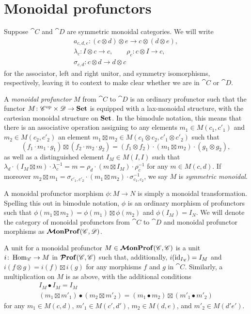 \documentclass[12pt,oneside,article,draft]{memoir}
\begin{document}
\section{Monoidal profunctors}

Suppose $\cat{C}$ and $\cat{D}$ are symmetric monoidal categories.  We will write
\begin{gather*}
   a_{c,d,e}\colon (c\otimes d)\otimes e \to c\otimes(d\otimes e), \\
      \lambda_c\colon I\otimes c\to c,
      \qquad \rho_c\colon c\otimes I \to c, \\
      \sigma_{c,d}\colon c\otimes d\to d\otimes c
\end{gather*}
for the associator, left and right unitor, and symmetry isomorphisms, respectively, leaving it to
context to make clear whether we are in $\cat{C}$ or $\cat{D}$.

A \emph{monoidal profunctor} $M$ from $\cat{C}$ to $\cat{D}$ is an ordinary profunctor such that the
functor $M\colon {\mathscr{C}}^{\text{op}}\times\mathscr{D}\to\mathbf{Set}$ is equipped with a lax-monoidal structure, with
the cartesian monoidal structure on $\mathbf{Set}$.  In the bimodule notation, this means that there is an
associative operation assigning to any elements $m_1\in M(c_1,c'_1)$ and $m_2\in M(c_2,c'_2)$ an
element $m_1\boxtimes m_2\in M(c_1\otimes c_2,c'_1\otimes c'_2)$ such that
\[
   (f_1\cdot m_1\cdot g_1)\boxtimes(f_2\cdot m_2\cdot g_2) = (f_1\otimes f_2)\cdot(m_1\boxtimes m_2)\cdot(g_1\otimes g_2),
\]
as well as a distinguished element $I_M\in M(I,I)$ such that $\lambda_d\cdot(I_M\boxtimes
m)\cdot\lambda^{-1}_c = m = \rho_d\cdot(m\boxtimes I_M)\cdot\rho^{-1}_c$ for any $m\in M(c,d)$.  If
moreover $m_2\boxtimes m_1 = \sigma_{c'_1,c'_2}\cdot(m_1\boxtimes m_2)\cdot\sigma_{c_1,c_2}^{-1}$,
we say $M$ is \emph{symmetric monoidal}.

A monoidal profunctor morphism $\phi\colon M\to N$ is simply a monoidal transformation.  Spelling
this out in bimodule notation, $\phi$ is an ordinary morphism of profunctors such that
$\phi(m_1\boxtimes m_2)=\phi(m_1)\boxtimes\phi(m_2)$ and $\phi(I_M)=I_N$.  We will denote the
category of monoidal profunctors from $\cat{C}$ to $\cat{D}$ and monoidal profunctor morphisms as
$\bm{\mathcal{M}}\mathbf{onProf}(\mathscr{C},\mathscr{D})$.

A unit for a monoidal profunctor $M\in\bm{\mathcal{M}}\mathbf{onProf}(\mathscr{C},\mathscr{C})$ is a unit $i\colon\operatorname{Hom}_{\mathscr{C}}\to
M$ in $\bm{\mathcal{P}}\mathbf{rof}(\mathscr{C},\mathscr{C})$ such that, additionally, $i(\operatorname{id}_{I_{\mathscr{C}}})=I_M$ and $i(f\otimes
g)=i(f)\boxtimes i(g)$ for any morphisms $f$ and $g$ in $\cat{C}$.  Similarly, a multiplication on
$M$ is as above, with the additional conditions
\begin{gather*}
   I_M\bullet I_M=I_M \\
   (m_1\boxtimes m'_1)\bullet(m_2\boxtimes m'_2) = (m_1\bullet m_2)\boxtimes(m'_1\bullet m'_2)
\end{gather*}
for any $m_1\in M(c,d)$, $m'_1\in M(c',d')$, $m_2\in M(d,e)$, and $m'_2\in M(d'e')$.
\end{document}
